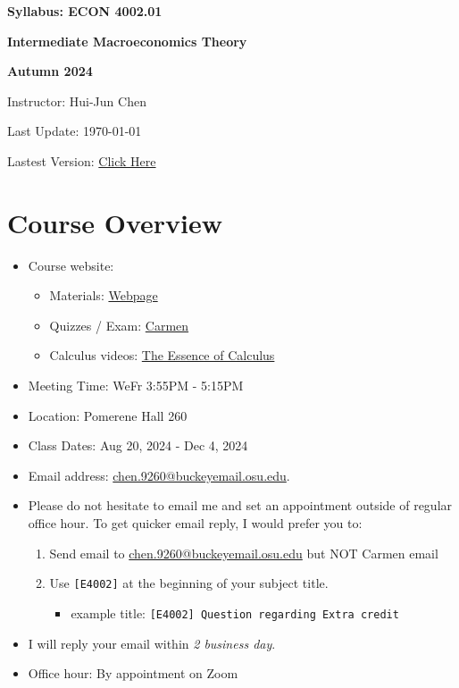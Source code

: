 \documentclass[12pt]{article}
\begin{document}
\centerline{\huge\bf Syllabus: ECON 4002.01}
\medskip
\centerline{\LARGE \bf Intermediate Macroeconomics Theory}
\medskip
\centerline{\LARGE \bf Autumn 2024}
\medskip
\centerline{\Large Instructor: Hui-Jun Chen}
\centerline{Last Update: \today}
\centerline{Lastest Version: \href{https://huijunchen9260.github.io/pdf/IntermediateMacroAutumn2024/syllabus/build/syllabus.pdf}{Click Here}}

\medskip

\tableofcontents

\section*{Course Overview}
\begin{itemize}

    \item Course website:
    \begin{itemize}
        \item Materials: \href{https://huijunchen9260.github.io/IntermediateMacroAutumn2024.html}{Webpage}
        \item Quizzes / Exam: \href{https://osu.instructure.com/courses/143643}{Carmen}
        \item Calculus videos: \href{https://www.youtube.com/watch?v=WUvTyaaNkzM&list=PLZHQObOWTQDMsr9K-rj53DwVRMYO3t5Yr}{The Essence of Calculus}
    \end{itemize}
    \item Meeting Time: WeFr 3:55PM - 5:15PM
    \item Location: Pomerene Hall 260
    \item Class Dates: Aug 20, 2024 - Dec 4, 2024
    \item Email address: \href{chen.9260@buckeyemail.osu.edu}{chen.9260@buckeyemail.osu.edu}.
    \item Please do not hesitate to email me and set an appointment outside of regular office hour. To get quicker email reply, I would prefer you to:
    \begin{enumerate}
        \item Send email to \href{chen.9260@buckeyemail.osu.edu}{chen.9260@buckeyemail.osu.edu} but NOT Carmen email
        \item Use \texttt{[E4002]} at the beginning of your subject title.
        \begin{itemize}
            \item example title: \texttt{[E4002] Question regarding Extra credit}
        \end{itemize}
    \end{enumerate}
    \item I will reply your email within \textit{2 business day}.
    \item Office hour: By appointment on Zoom
\end{itemize}
\end{document}
